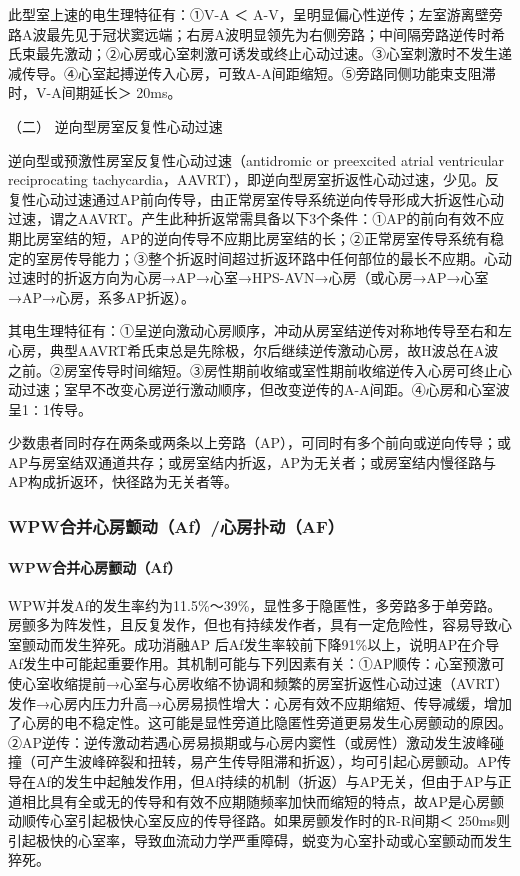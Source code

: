 此型室上速的电生理特征有：①V-A ＜
A-V，呈明显偏心性逆传；左室游离壁旁路A波最先见于冠状窦远端；右房A波明显领先为右侧旁路；中间隔旁路逆传时希氏束最先激动；②心房或心室刺激可诱发或终止心动过速。③心室刺激时不发生递减传导。④心室起搏逆传入心房，可致A-A间距缩短。⑤旁路同侧功能束支阻滞时，V-A间期延长＞
20ms。

\hypertarget{text00294.htmlux5cux23CHP10-2-7-1-3-2}{}
（二） 逆向型房室反复性心动过速

逆向型或预激性房室反复性心动过速（antidromic or preexcited atrial
ventricular reciprocating
tachycardia，AAVRT），即逆向型房室折返性心动过速，少见。反复性心动过速通过AP前向传导，由正常房室传导系统逆向传导形成大折返性心动过速，谓之AAVRT。产生此种折返常需具备以下3个条件：①AP的前向有效不应期比房室结的短，AP的逆向传导不应期比房室结的长；②正常房室传导系统有稳定的室房传导能力；③整个折返时间超过折返环路中任何部位的最长不应期。心动过速时的折返方向为心房→AP→心室→HPS-AVN→心房（或心房→AP→心室→AP→心房，系多AP折返）。

其电生理特征有：①呈逆向激动心房顺序，冲动从房室结逆传对称地传导至右和左心房，典型AAVRT希氏束总是先除极，尔后继续逆传激动心房，故H波总在A波之前。②房室传导时间缩短。③房性期前收缩或室性期前收缩逆传入心房可终止心动过速；室早不改变心房逆行激动顺序，但改变逆传的A-A间距。④心房和心室波呈1∶1传导。

少数患者同时存在两条或两条以上旁路（AP），可同时有多个前向或逆向传导；或AP与房室结双通道共存；或房室结内折返，AP为无关者；或房室结内慢径路与AP构成折返环，快径路为无关者等。

\subsubsection{WPW合并心房颤动（Af）/心房扑动（AF）}

\paragraph{WPW合并心房颤动（Af）}

WPW并发Af的发生率约为11.5\%～39\%，显性多于隐匿性，多旁路多于单旁路。房颤多为阵发性，且反复发作，但也有持续发作者，具有一定危险性，容易导致心室颤动而发生猝死。成功消融AP
后Af发生率较前下降91\%以上，说明AP在介导Af发生中可能起重要作用。其机制可能与下列因素有关：①AP顺传：心室预激可使心室收缩提前→心室与心房收缩不协调和频繁的房室折返性心动过速（AVRT）发作→心房内压力升高→心房易损性增大：心房有效不应期缩短、传导减缓，增加了心房的电不稳定性。这可能是显性旁道比隐匿性旁道更易发生心房颤动的原因。②AP逆传：逆传激动若遇心房易损期或与心房内窦性（或房性）激动发生波峰碰撞（可产生波峰碎裂和扭转，易产生传导阻滞和折返），均可引起心房颤动。AP传导在Af的发生中起触发作用，但Af持续的机制（折返）与AP无关，但由于AP与正道相比具有全或无的传导和有效不应期随频率加快而缩短的特点，故AP是心房颤动顺传心室引起极快心室反应的传导径路。如果房颤发作时的R-R间期＜
250ms则引起极快的心室率，导致血流动力学严重障碍，蜕变为心室扑动或心室颤动而发生猝死。

